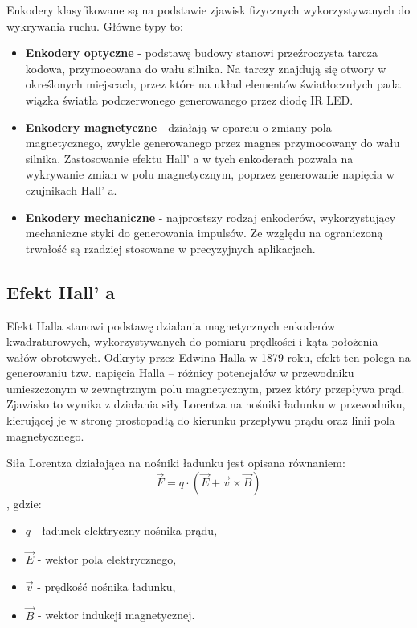 Enkodery klasyfikowane są na podstawie zjawisk fizycznych wykorzystywanych do wykrywania ruchu. Główne typy to\cite{bib:enkoder-mag-opt}:

\begin{itemize}
    \item \textbf{Enkodery optyczne} - podstawę budowy stanowi przeźroczysta tarcza kodowa, przymocowana do wału silnika. Na tarczy znajdują się otwory w określonych miejscach, przez które na układ elementów światłoczułych pada wiązka światła podczerwonego generowanego przez diodę IR LED. 
    \item \textbf{Enkodery magnetyczne} - działają w oparciu o zmiany pola magnetycznego, zwykle generowanego przez magnes przymocowany do wału silnika. Zastosowanie efektu Hall' a w tych enkoderach pozwala na wykrywanie zmian w polu magnetycznym, poprzez generowanie napięcia w czujnikach Hall' a.
    \item \textbf{Enkodery mechaniczne} - najprostszy rodzaj enkoderów, wykorzystujący mechaniczne styki do generowania impulsów. Ze względu na ograniczoną trwałość są rzadziej stosowane w precyzyjnych aplikacjach.
\end{itemize}


\subsection{Efekt Hall' a}

Efekt Halla \cite{bib:zjawisko-halla} stanowi podstawę działania magnetycznych enkoderów kwadraturowych, wykorzystywanych do pomiaru prędkości i kąta położenia wałów obrotowych. Odkryty przez Edwina Halla w 1879 roku, efekt ten polega na generowaniu tzw. napięcia Halla – różnicy potencjałów w przewodniku umieszczonym w zewnętrznym polu magnetycznym, przez który przepływa prąd. Zjawisko to wynika z działania siły Lorentza na nośniki ładunku w przewodniku, kierującej je w stronę prostopadłą do kierunku przepływu prądu oraz linii pola magnetycznego.

Siła Lorentza działająca na nośniki ładunku jest opisana równaniem:
\[
\vec{F} = q \cdot (\vec{E} + \vec{v} \times \vec{B})
\]
, gdzie:
\begin{itemize}
    \item \( q \) - ładunek elektryczny nośnika prądu,
    \item \( \vec{E} \) - wektor pola elektrycznego,
    \item \( \vec{v} \) - prędkość nośnika ładunku,
    \item \( \vec{B} \) - wektor indukcji magnetycznej.
\end{itemize}

